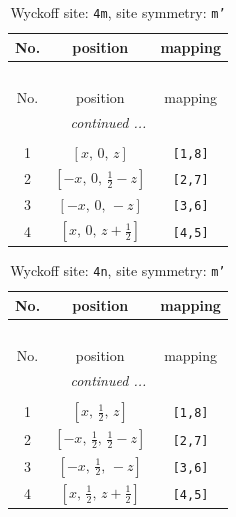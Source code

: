 \documentclass[fleqn,8pt]{jsarticle}
\begin{document}
\renewcommand{\arraystretch}{1.2}
\begin{longtable}{ccc}
\caption{Wyckoff site: {\tt 4m}, site symmetry: {\tt m'}}
 \\
 \hline \hline
No. & position & mapping \\ \hline \endfirsthead

\multicolumn{2}{l}{\tablename\ \thetable{}} \\
 \hline \hline
No. & position & mapping \\ \hline \endhead

 \hline \hline
\multicolumn{2}{r}{\footnotesize\it continued ...} \\ \endfoot

 \hline \hline
\multicolumn{2}{r}{} \\ \endlastfoot

1 & $\left[ x,\, 0,\, z \right]$ & {\tt [1,8]} \\ \hline
2 & $\left[ - x,\, 0,\, \frac{1}{2} - z \right]$ & {\tt [2,7]} \\ \hline
3 & $\left[ - x,\, 0,\, - z \right]$ & {\tt [3,6]} \\ \hline
4 & $\left[ x,\, 0,\, z + \frac{1}{2} \right]$ & {\tt [4,5]} \\
\end{longtable}
\renewcommand{\arraystretch}{1.2}
\begin{longtable}{ccc}
\caption{Wyckoff site: {\tt 4n}, site symmetry: {\tt m'}}
 \\
 \hline \hline
No. & position & mapping \\ \hline \endfirsthead

\multicolumn{2}{l}{\tablename\ \thetable{}} \\
 \hline \hline
No. & position & mapping \\ \hline \endhead

 \hline \hline
\multicolumn{2}{r}{\footnotesize\it continued ...} \\ \endfoot

 \hline \hline
\multicolumn{2}{r}{} \\ \endlastfoot

1 & $\left[ x,\, \frac{1}{2},\, z \right]$ & {\tt [1,8]} \\ \hline
2 & $\left[ - x,\, \frac{1}{2},\, \frac{1}{2} - z \right]$ & {\tt [2,7]} \\ \hline
3 & $\left[ - x,\, \frac{1}{2},\, - z \right]$ & {\tt [3,6]} \\ \hline
4 & $\left[ x,\, \frac{1}{2},\, z + \frac{1}{2} \right]$ & {\tt [4,5]} \\
\end{longtable}
\end{document}
